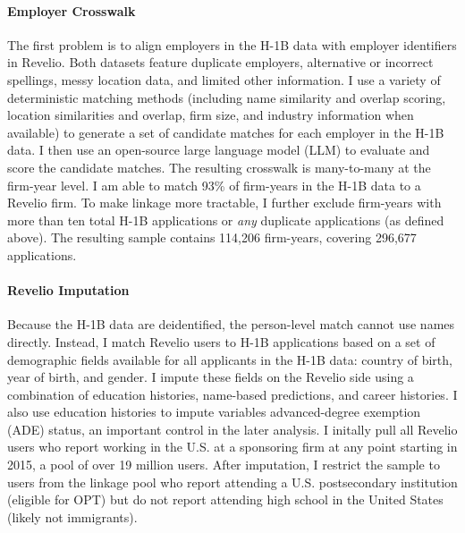 \paragraph{Employer Crosswalk} The first problem is to align employers in the H-1B data with employer identifiers in Revelio. Both datasets feature duplicate employers, alternative or incorrect spellings, messy location data, and limited other information. I use a variety of deterministic matching methods (including name similarity and overlap scoring, location similarities and overlap, firm size, and industry information when available) to generate a set of candidate matches for each employer in the H-1B data. I then use an open-source large language model (LLM) to evaluate and score the candidate matches. The resulting crosswalk is many-to-many at the firm-year level. I am able to match 93\% of firm-years in the H-1B data to a Revelio firm. To make linkage more tractable, I further exclude firm-years with more than ten total H-1B applications or \textit{any} duplicate applications (as defined above). The resulting sample contains 114,206 firm-years, covering 296,677 applications. 



\paragraph{Revelio Imputation} Because the H-1B data are deidentified, the person-level match cannot use names directly. Instead, I match Revelio users to H-1B applications based on a set of demographic fields available for all applicants in the H-1B data: country of birth, year of birth, and gender. I impute these fields on the Revelio side using a combination of education histories, name-based predictions, and career histories. I also use education histories to impute variables advanced-degree exemption (ADE) status, an important control in the later analysis. I initally pull all Revelio users who report working in the U.S. at a sponsoring firm at any point starting in 2015, a pool of over 19 million users. After imputation, I restrict the sample to users from the linkage pool who report attending a U.S. postsecondary institution (eligible for OPT) but do not report attending high school in the United States (likely not immigrants).

